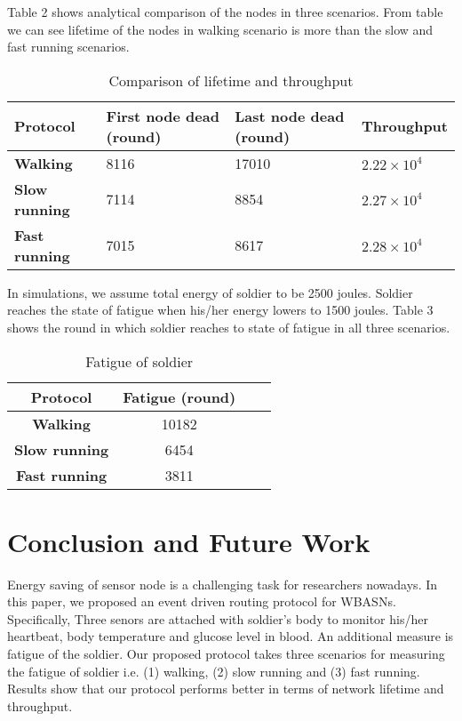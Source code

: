 \documentclass[journal]{IEEEtran}
\begin{document}
 Table 2 shows analytical comparison of the nodes in three scenarios. From table we can see lifetime of the nodes in walking scenario is more than the slow and
  fast running scenarios.
  \begin{table}[!ht]
\begin{center}
\caption{Comparison of lifetime and throughput}
 \begin{tabular}{|p{1.5cm}|p{2cm}|p{2cm}|p{2cm}|}\hline
   \textbf{Protocol}           & \textbf{First node dead (round)} & \textbf{Last node dead (round)}  & \textbf{Throughput} \\ \hline \hline
    \textbf{Walking }          &  8116                         & 17010                            & $2.22\times10^4$\\ \hline
     \textbf{Slow running}     &  7114                         & 8854                             & $2.27\times10^4$\\ \hline
      \textbf{Fast running}    &  7015                         & 8617                             &$2.28\times10^4$\\ \hline
\end{tabular}
\end{center}
\end{table}

In simulations, we assume total energy of soldier to be 2500 joules. Soldier reaches the state of fatigue when his/her energy lowers to 1500 joules. Table 3
shows the round in which soldier reaches to state of fatigue in all three scenarios.

\begin{table}[!ht]
\begin{center}
\caption{Fatigue of soldier}
  \begin{tabular}{|c|c|c|c|}\hline
   \textbf{Protocol}            & \textbf{Fatigue (round)}       \\ \hline \hline
    \textbf{Walking }           & 10182                           \\ \hline
     \textbf{Slow running}      & 6454                             \\ \hline
      \textbf{Fast running}     & 3811                              \\ \hline
\end{tabular}
\end{center}
\end{table}

\vspace{-1cm}
\section{Conclusion and Future Work}
Energy saving of sensor node is a challenging task for researchers nowadays. In this paper, we proposed an event driven routing protocol for WBASNs. Specifically,
Three senors are attached with soldier's body to monitor his/her heartbeat, body temperature and glucose level in blood. An additional measure is fatigue of the
soldier. Our
 proposed protocol takes three scenarios for measuring the fatigue of soldier i.e. (1) walking, (2) slow running and (3) fast running. Results show that our
  protocol performs better in terms of network lifetime and throughput.
\end{document}
